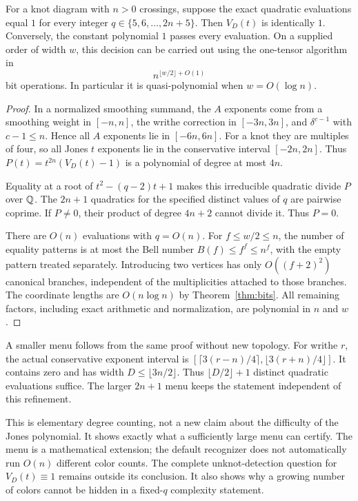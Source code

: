 \begin{proposition}\label{prop:menu}
For a knot diagram with $n>0$ crossings, suppose the exact quadratic
evaluations equal $1$ for every integer
$q\in\{5,6,\ldots,2n+5\}$. Then $V_D(t)$ is identically $1$.
Conversely, the constant polynomial $1$ passes every evaluation.
On a supplied order of width $w$, this decision can be carried out using
the one-tensor algorithm in
\[
 n^{\lfloor w/2\rfloor+O(1)}
\]
bit operations. In particular it is quasi-polynomial when
$w=O(\log n)$.
\end{proposition}
\begin{proof}
In a normalized smoothing summand, the $A$ exponents come from a smoothing
weight in $[-n,n]$, the writhe correction in $[-3n,3n]$, and
$\delta^{c-1}$ with $c-1\le n$. Hence all $A$ exponents lie in $[-6n,6n]$.
For a knot they are multiples of four, so all Jones $t$ exponents lie in
the conservative interval $[-2n,2n]$.
Thus $P(t)=t^{2n}(V_D(t)-1)$ is a polynomial of degree at most $4n$.

Equality at a root of $t^2-(q-2)t+1$ makes this irreducible quadratic divide
$P$ over $\mathbb Q$. The $2n+1$ quadratics for the specified distinct values of
$q$ are pairwise coprime. If $P\ne0$, their product of degree $4n+2$
cannot divide it. Thus $P=0$.

There are $O(n)$ evaluations with $q=O(n)$. For $f\le w/2\le n$,
the number of equality patterns is at most the Bell number
$B(f)\le f^f\le n^f$, with the empty pattern treated separately.
Introducing two vertices has only $O((f+2)^2)$ canonical branches,
independent of the multiplicities attached to those branches.
The coordinate lengths are $O(n\log n)$ by Theorem~\ref{thm:bits}.
All remaining factors, including exact arithmetic and normalization, are
polynomial in $n$ and $w$.
\end{proof}

A smaller menu follows from the same proof without new topology.
For writhe $r$, the actual conservative exponent interval is
$[\lceil3(r-n)/4\rceil,\lfloor3(r+n)/4\rfloor]$.
It contains zero and has width $D\le\lfloor3n/2\rfloor$.
Thus $\lfloor D/2\rfloor+1$ distinct quadratic evaluations suffice.
The larger $2n+1$ menu keeps the statement independent of this refinement.

This is elementary degree counting, not a new claim about the difficulty of
the Jones polynomial. It shows exactly what a sufficiently large menu can
certify. The menu is a mathematical extension; the default recognizer does
not automatically run $O(n)$ different color counts. The complete
unknot-detection question for $V_D(t)\equiv1$ remains outside its conclusion.
It also shows why a growing number of colors cannot be hidden in a
fixed-$q$ complexity statement.

